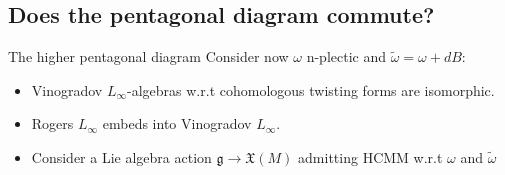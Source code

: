 \documentclass[10pt]{beamer}
\begin{document}
\subsection{Does the pentagonal \textbf{diagram commute}?}
\subcheckpoint	


\begin{frame}{The higher pentagonal diagram}
	Consider now $\omega$ \alert{n-plectic} \quad and \quad \alert{$\tilde{\omega}=\omega + d B$}:
	\vfill
	\only<2->{\vspace{-2em}}
	\begin{center}
		
	\end{center}	
	\vfill
	\begin{itemize}
		\item<2-> Vinogradov $L_\infty$-algebras w.r.t cohomologous twisting forms are isomorphic.
		\item<2-> Rogers $L_\infty$ embeds into Vinogradov $L_\infty$.
		\item<3-> Consider a Lie algebra action $\mathfrak{g}\to \mathfrak{X}(M)$ admitting HCMM w.r.t $\omega$ and $\tilde{\omega}$
	\end{itemize}

	\vfill
	

\end{frame}
\end{document}
